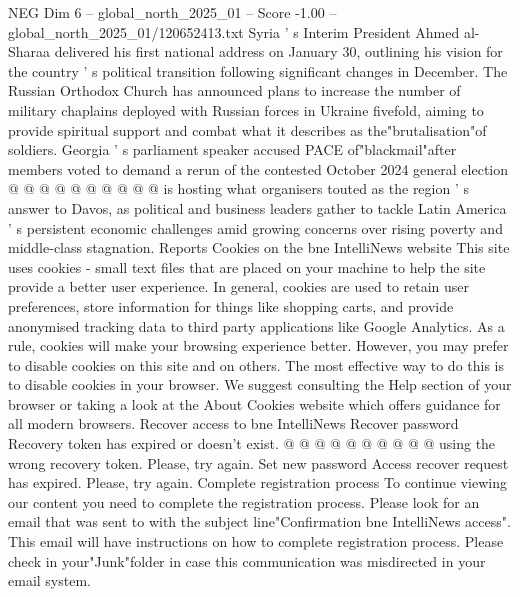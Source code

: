 \begin{textsample}{NEG Dim 6 – global\_north\_2025\_01 – Score -1.00 – global\_north\_2025\_01/120652413.txt}
Syria ' s Interim President Ahmed al-Sharaa delivered his first national address on January 30, outlining his vision for the country ' s political transition following significant changes in December.
The Russian Orthodox Church has announced plans to increase the number of military chaplains deployed with Russian forces in Ukraine fivefold, aiming to provide spiritual support and combat what it describes as the"brutalisation"of soldiers.
Georgia ' s parliament speaker accused PACE of"blackmail"after members voted to demand a rerun of the contested October 2024 general election @ @ @ @ @ @ @ @ @ @ is hosting what organisers touted as the region ' s answer to Davos, as political and business leaders gather to tackle Latin America ' s persistent economic challenges amid growing concerns over rising poverty and middle-class stagnation.
Reports Cookies on the bne IntelliNews website This site uses cookies - small text files that are placed on your machine to help the site provide a better user experience.
In general, cookies are used to retain user preferences, store information for things like shopping carts, and provide anonymised tracking data to third party applications like Google Analytics.
As a rule, cookies will make your browsing experience better.
However, you may prefer to disable cookies on this site and on others.
The most effective way to do this is to disable cookies in your browser.
We suggest consulting the Help section of your browser or taking a look at the About Cookies website which offers guidance for all modern browsers.
Recover access to bne IntelliNews Recover password Recovery token has expired or doesn't exist. @ @ @ @ @ @ @ @ @ @ using the wrong recovery token.
Please, try again.
Set new password Access recover request has expired.
Please, try again.
Complete registration process To continue viewing our content you need to complete the registration process.
Please look for an email that was sent to with the subject line"Confirmation bne IntelliNews access".
This email will have instructions on how to complete registration process.
Please check in your"Junk"folder in case this communication was misdirected in your email system.

\end{textsample}
